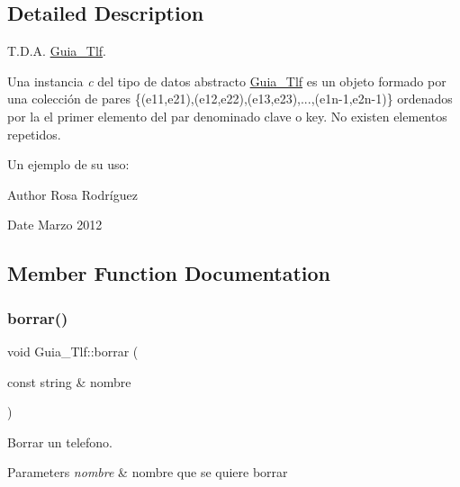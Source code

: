 \subsection{Detailed Description}
T.\+D.\+A. \mbox{\hyperlink{classGuia__Tlf}{Guia\+\_\+\+Tlf}}. 

Una instancia {\itshape c} del tipo de datos abstracto {\ttfamily \mbox{\hyperlink{classGuia__Tlf}{Guia\+\_\+\+Tlf}}} es un objeto formado por una colección de pares \{(e11,e21),(e12,e22),(e13,e23),...,(e1n-\/1,e2n-\/1)\} ordenados por la el primer elemento del par denominado clave o key. No existen elementos repetidos.

Un ejemplo de su uso\+:

\begin{DoxyAuthor}{Author}
Rosa Rodríguez 
\end{DoxyAuthor}
\begin{DoxyDate}{Date}
Marzo 2012 
\end{DoxyDate}


\subsection{Member Function Documentation}
\mbox{\label{classGuia__Tlf_a57e32bbc9e76567d22e5275d4d2a6515}} 
\subsubsection{\texorpdfstring{borrar()}{borrar()}}
{\footnotesize\ttfamily void Guia\+\_\+\+Tlf\+::borrar (\begin{DoxyParamCaption}\item[{const string \&}]{nombre }\end{DoxyParamCaption})}



Borrar un telefono. 


\begin{DoxyParams}{Parameters}
{\em nombre} & nombre que se quiere borrar \\
\hline
\end{DoxyParams}
\mbox{\label{classGuia__Tlf_ad7e5c338e32e8521b1211493e743399d}} 

